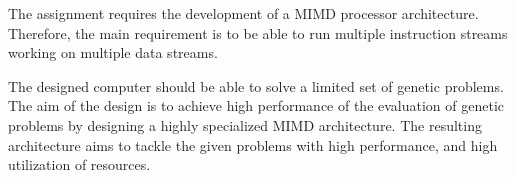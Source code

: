 The assignment requires the development of a MIMD processor architecture.
Therefore, the main requirement is to be able to run multiple instruction streams working on multiple data streams.

The designed computer should be able to solve a limited set of genetic problems.
The aim of the design is to achieve high performance of the evaluation of genetic problems by designing a highly specialized MIMD architecture.
The resulting architecture aims to tackle the given problems with high performance, and high utilization of resources.

